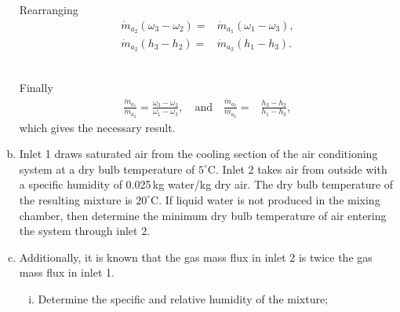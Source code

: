 \documentclass[calculator,steamtables,refrigeranttables,psychrometricchart,datasheet,resit]{exam}
\begin{document}
\begin{question}
\begin{enumerate}[(a)]
{Rearranging
\begin{align*}
 \dot{m}_{a_2} \left(\omega_3 - \omega_2\right) =& \dot{m}_{a_1} \left(\omega_1 - \omega_3\right), \\
 \dot{m}_{a_2} \left(h_3 - h_2\right) =& \dot{m}_{a_2} \left(h_1 - h_3\right).
\end{align*}~

Finally
\begin{align*}
 \frac{\dot{m}_{a_1}}{\dot{m}_{a_2}} = \frac{\omega_3 - \omega_2}{\omega_1 - \omega_3}, \quad \mbox{and} \quad \frac{\dot{m}_{a_2}}{\dot{m}_{a_2}} =& \frac{h_3 - h_2}{h_1 - h_3},
\end{align*}
which gives the necessary result.
}

\item Inlet 1 draws saturated air from the cooling section of the air conditioning system at a dry bulb temperature of $5^\circ$C. Inlet 2 takes air from outside with a specific humidity of 0.025\,kg water/kg dry air. The dry bulb temperature of the resulting mixture is $20^\circ$C. If liquid water is not produced in the mixing chamber, then determine the minimum dry bulb temperature of air entering the system through inlet 2. 

\item Additionally, it is known that the gas mass flux in inlet 2 is twice the gas mass flux in inlet 1.
\begin{enumerate}[(i)]
\item Determine the specific and relative humidity of the mixture; 
\end{enumerate}
\end{enumerate}
\end{question}
\end{document}
